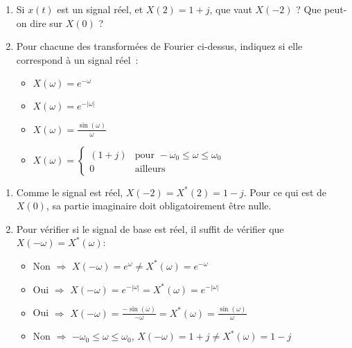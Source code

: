 \documentclass [a4paper, 11pt] {article}
\begin{document}
    \begin{exercice}{3}
        \begin{enumerate}
            \item Si $x(t)$ est un signal réel, et $X(2)=1+j$, que vaut $X(-2)$ ? Que peut-on dire sur $X(0)$ ?
            \item Pour chacune des transformées de Fourier ci-dessus, indiquez si elle correspond à un signal réel :            
            \begin{itemize}
                \item $X(\omega)=e^{-\omega}$
                \item $X(\omega)=e^{-|\omega|}$
                \item $X(\omega)=\frac{\sin(\omega)}{\omega}$
                \item $X(\omega)=\left\{\begin{array}{ll}(1+j)&\mbox{pour } -\omega_0 \leq \omega \leq \omega_0\\0&\mbox{ailleurs} \end{array}\right.$
            \end{itemize}
        \end{enumerate}

    \end{exercice}
    
    \begin{reponse}
        \begin{enumerate}
            \item Comme le signal est réel, $X(-2)=X^*(2)=1-j$. Pour ce qui est de $X(0)$, sa partie imaginaire doit obligatoirement être nulle.
            \item Pour vérifier si le signal de base est réel, il suffit de vérifier que $X(-\omega)=X^*(\omega)$:
            \begin{itemize}
                \item Non $\Rightarrow$ $X(-\omega)=e^{\omega}\ne X^*(\omega)=e^{-\omega}$
                \item Oui $\Rightarrow$ $X(-\omega)=e^{-|\omega|} = X^*(\omega)=e^{-|\omega|}$
                \item Oui $\Rightarrow$ $X(-\omega)=\frac{-\sin(\omega)}{-\omega}=X^*(\omega)=\frac{\sin(\omega)}{\omega}$
                \item Non $\Rightarrow$ $-\omega_0 \leq \omega \leq \omega_0$, $X(-\omega)=1+j\ne X^*(\omega)=1-j$
            \end{itemize}
        \end{enumerate}
    \end{reponse}
\end{document}
